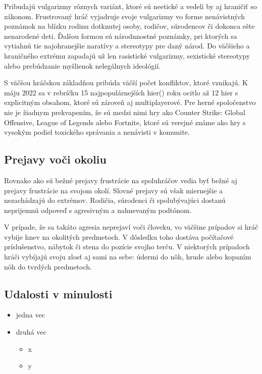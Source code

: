 \documentclass[10pt,twoside,slovak,a4paper]{article}
\begin{document}
Pribudajú vulgarizmy rôznych variánt, ktoré sú neetické a vedeli by aj hraničiť so zákonom. Frustrovaný hráč vyjadruje svoje vulgarizmy vo forme nenávistných poznámok na blízku rodinu dotknutej osoby, rodičov, súrodencov či dokonca ešte nenarodené deti. Ďalšou formou sú národnnostné poznámky, pri ktorých sa vytiahnú tie najohranejšie naratívy a stereotypy pre daný národ. Do väčšieho a hraničného extrému zapadajú už len rasistické vulgarizmy, sexistické stereotypy alebo prebúdzanie myšlienok nelegálnych ideológií.

S väčšou hráčskou základňou pribúda väčší počet konfliktov, ktoré vznikajú. K máju 2022 sa v rebríčku 15 najpopulárnejších hier(\cite{TopGames}) roku ocitlo až 12 hier s explicitným obsahom, ktoré sú zároveň aj multiplayerové. Pre herné spoločenstvo nie je žiadnym prekvapením, že sú medzi nimi hry ako Counter Strike: Global Offensive, League of Legends alebo Fortnite, ktoré sú verejné známe ako hry s vysokým podiel toxického správania a nenávisti v komunite.

\subsection{Prejavy voči okoliu} \label{ina:okolie}
Rovnako ako sú bežné prejavy frustrácie na spoluhráčov vedia byť bežné aj prejavy frustrácie na svojom okolí. Slovné prejavy sú však miernejšie a nezachádzajú do extrémov. Rodičia, súrodenci či spolubývajúci dostanú neprijemnú odpoveď s agresivným a nahnevaným podtónom. 

V prípade, že sa takáto agresia neprejaví voči človeku, vo väčšine prípadov si hráč vybije hnev na okolitých predmetoch. V dôsledku toho dostáva počítačové príslušenstvo, nábytok či stena do pozície svojho terču. V niektorých prípadoch hráči vybíjajú svoju zlosť aj sami na sebe: údermi do nôh, hrude alebo kopaním nôh do tvrdých predmetoch.
\subsection{Udalosti v minulosti} \label{ina:minulost}


\begin{itemize}
\item jedna vec
\item druhá vec
	\begin{itemize}
	\item x
	\item y
	\end{itemize}
\end{itemize}
\end{document}

